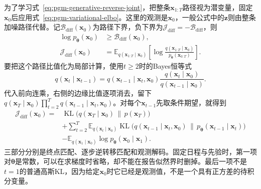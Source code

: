 为了学习式~\eqref{eq:pgm-generative-reverse-joint}，把整条$\bm{x}_{1:T}$路径视为潜变量，固定$\bm{x}_0$后应用式~\eqref{eq:pgm-variational-elbo}。这里的观测是$\bm{x}_0$，一般公式中的$\bm{z}$则由整条加噪路径代替。记$\mathcal{B}_{\mathrm{diff}}(\bm{x}_0)$为路径下界，负下界为$\mathcal{J}_{\mathrm{diff}}=-\mathcal{B}_{\mathrm{diff}}$，则
\begin{equation}
  \label{eq:pgm-generative-path-elbo}
  \begin{aligned}
    \log p_{\bm{\theta}}(\bm{x}_0)
      &\geq\mathcal{B}_{\mathrm{diff}}(\bm{x}_0),\\
    \mathcal{J}_{\mathrm{diff}}(\bm{x}_0)
      &=\mathbb{E}_{q(\bm{x}_{1:T}\mid\bm{x}_0)}
         \left[\log
           \frac{q(\bm{x}_{1:T}\mid\bm{x}_0)}
                {p_{\bm{\theta}}(\bm{x}_{0:T})}
         \right].
  \end{aligned}
\end{equation}
要把这个路径比值化为局部计算，使用$t\geq2$时的Bayes恒等式
\[
  q(\bm{x}_t\mid\bm{x}_{t-1})
  =q(\bm{x}_{t-1}\mid\bm{x}_t,\bm{x}_0)
     \frac{q(\bm{x}_t\mid\bm{x}_0)}
          {q(\bm{x}_{t-1}\mid\bm{x}_0)}.
\]
代入前向连乘，右侧的边缘比值逐项消去，留下$q(\bm{x}_T\mid\bm{x}_0)\prod_{t=2}^{T}q(\bm{x}_{t-1}\mid\bm{x}_t,\bm{x}_0)$。对每个$\bm{x}_{t-1}$先取条件期望，就得到
\begin{equation}
  \label{eq:pgm-generative-ddpm-kl}
  \begin{aligned}
    \mathcal{J}_{\mathrm{diff}}(\bm{x}_0)
      ={}&\operatorname{KL}\bigl(
          q(\bm{x}_T\mid\bm{x}_0)\,\|\,p(\bm{x}_T)\bigr)\\
       &+\sum_{t=2}^{T}
         \mathbb{E}_{q(\bm{x}_t\mid\bm{x}_0)}
          \operatorname{KL}\bigl(
           q(\bm{x}_{t-1}\mid\bm{x}_t,\bm{x}_0)
           \,\|\,p_{\bm{\theta}}(\bm{x}_{t-1}\mid\bm{x}_t)
                         \bigr)\\
       &-\mathbb{E}_{q(\bm{x}_1\mid\bm{x}_0)}
          \log p_{\bm{\theta}}(\bm{x}_0\mid\bm{x}_1).
  \end{aligned}
\end{equation}
三部分分别是终点匹配、逐步逆转移匹配和观测解码。固定日程与先验时，第一项对$\bm{\theta}$是常数，可以在求梯度时省略，却不能在报告似然界时删掉。最后一项不是$t=1$的普通高斯KL，因为给定$\bm{x}_0$时它已经是观测值，不是一个具有正方差的待积分变量。

